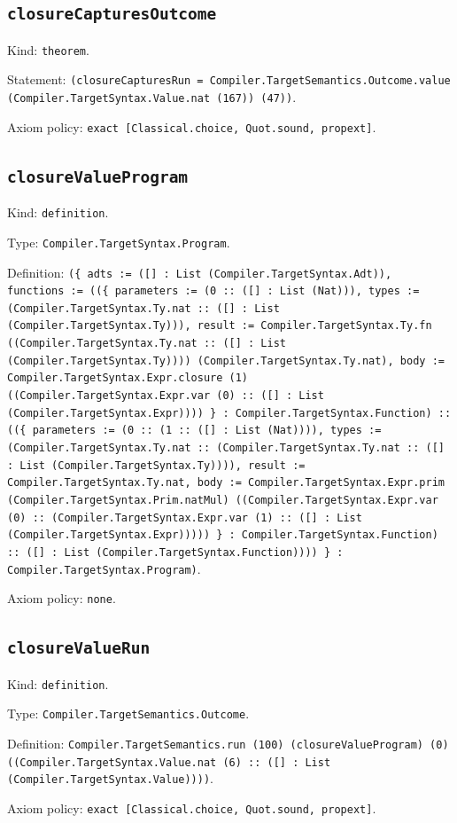 \documentclass[11pt]{article}
\begin{document}
\subsection*{\texttt{closureCapturesOutcome}}
\noindent Kind: \texttt{theorem}.\par
\noindent Statement: \texttt{(closureCapturesRun = Compiler.TargetSemantics.Outcome.value (Compiler.TargetSyntax.Value.nat (167)) (47))}.\par
\noindent Axiom policy: \texttt{exact [Classical.choice, Quot.sound, propext]}.\par
\subsection*{\texttt{closureValueProgram}}
\noindent Kind: \texttt{definition}.\par
\noindent Type: \texttt{Compiler.TargetSyntax.Program}.\par
\noindent Definition: \texttt{(\{ adts := ([] : List (Compiler.TargetSyntax.Adt)), functions := ((\{ parameters := (0 :: ([] : List (Nat))), types := (Compiler.TargetSyntax.Ty.nat :: ([] : List (Compiler.TargetSyntax.Ty))), result := Compiler.TargetSyntax.Ty.fn ((Compiler.TargetSyntax.Ty.nat :: ([] : List (Compiler.TargetSyntax.Ty)))) (Compiler.TargetSyntax.Ty.nat), body := Compiler.TargetSyntax.Expr.closure (1) ((Compiler.TargetSyntax.Expr.var (0) :: ([] : List (Compiler.TargetSyntax.Expr)))) \} : Compiler.TargetSyntax.Function) :: ((\{ parameters := (0 :: (1 :: ([] : List (Nat)))), types := (Compiler.TargetSyntax.Ty.nat :: (Compiler.TargetSyntax.Ty.nat :: ([] : List (Compiler.TargetSyntax.Ty)))), result := Compiler.TargetSyntax.Ty.nat, body := Compiler.TargetSyntax.Expr.prim (Compiler.TargetSyntax.Prim.natMul) ((Compiler.TargetSyntax.Expr.var (0) :: (Compiler.TargetSyntax.Expr.var (1) :: ([] : List (Compiler.TargetSyntax.Expr))))) \} : Compiler.TargetSyntax.Function) :: ([] : List (Compiler.TargetSyntax.Function)))) \} : Compiler.TargetSyntax.Program)}.\par
\noindent Axiom policy: \texttt{none}.\par
\subsection*{\texttt{closureValueRun}}
\noindent Kind: \texttt{definition}.\par
\noindent Type: \texttt{Compiler.TargetSemantics.Outcome}.\par
\noindent Definition: \texttt{Compiler.TargetSemantics.run (100) (closureValueProgram) (0) ((Compiler.TargetSyntax.Value.nat (6) :: ([] : List (Compiler.TargetSyntax.Value))))}.\par
\noindent Axiom policy: \texttt{exact [Classical.choice, Quot.sound, propext]}.\par
\end{document}

